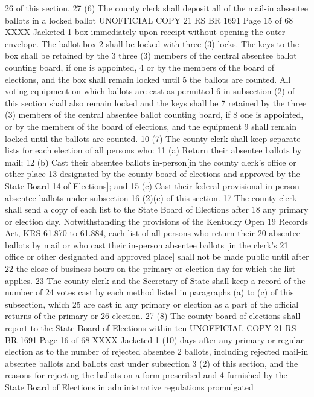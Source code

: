 26 of this section.
27 (6) The county clerk shall deposit all of the mail-in absentee ballots in a locked ballot 
UNOFFICIAL COPY 21 RS BR 1691
Page 15 of 68
XXXX Jacketed
1 box immediately upon receipt without opening the outer envelope. The ballot box
2 shall be locked with three (3) locks. The keys to the box shall be retained by the
3 three (3) members of the central absentee ballot counting board, if one is appointed,
4 or by the members of the board of elections, and the box shall remain locked until
5 the ballots are counted. All voting equipment on which ballots are cast as permitted
6 in subsection (2) of this section shall also remain locked and the keys shall be
7 retained by the three (3) members of the central absentee ballot counting board, if
8 one is appointed, or by the members of the board of elections, and the equipment
9 shall remain locked until the ballots are counted.
10 (7) The county clerk shall keep separate lists for each election of all persons who:
11 (a) Return their absentee ballots by mail;
12 (b) Cast their absentee ballots in-person[in the county clerk's office or other place
13 designated by the county board of elections and approved by the State Board
14 of Elections]; and
15 (c) Cast their federal provisional in-person absentee ballots under subsection
16 (2)(c) of this section.
17 The county clerk shall send a copy of each list to the State Board of Elections after
18 any primary or election day. Notwithstanding the provisions of the Kentucky Open
19 Records Act, KRS 61.870 to 61.884, each list of all persons who return their
20 absentee ballots by mail or who cast their in-person absentee ballots [in the clerk's
21 office or other designated and approved place] shall not be made public until after
22 the close of business hours on the primary or election day for which the list applies.
23 The county clerk and the Secretary of State shall keep a record of the number of
24 votes cast by each method listed in paragraphs (a) to (c) of this subsection, which
25 are cast in any primary or election as a part of the official returns of the primary or
26 election.
27 (8) The county board of elections shall report to the State Board of Elections within ten 
UNOFFICIAL COPY 21 RS BR 1691
Page 16 of 68
XXXX Jacketed
1 (10) days after any primary or regular election as to the number of rejected absentee
2 ballots, including rejected mail-in absentee ballots and ballots cast under subsection
3 (2) of this section, and the reasons for rejecting the ballots on a form prescribed and
4 furnished by the State Board of Elections in administrative regulations promulgated
